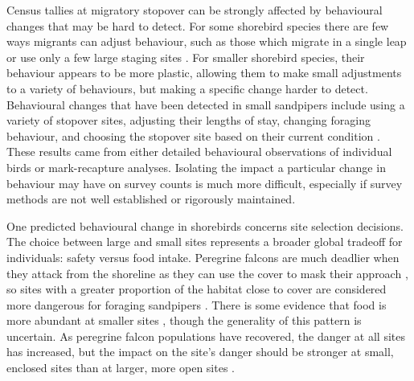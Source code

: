 Census tallies at migratory stopover can be strongly affected by behavioural changes that may be hard to detect. For some shorebird species there are few ways migrants can adjust behaviour, such as those which migrate in a single leap \citep{GillJr.2009} or use only a few large staging sites \citep{Gillings2009b}. For smaller shorebird species, their behaviour appears to be more plastic, allowing them to make small adjustments to a variety of behaviours, but making a specific change harder to detect. Behavioural changes that have been detected in small sandpipers include using a variety of stopover sites, adjusting their lengths of stay, changing foraging behaviour, and choosing the stopover site based on their current condition \citep{Ydenberg2002,Beauchamp2006a,pomeroy_tradeoffs_2006,Dekker2011,Hope2014,Quinn2012a}. These results came from either detailed behavioural observations of individual birds or mark-recapture analyses. Isolating the impact a particular change in behaviour may have on survey counts is much more difficult, especially if survey methods are not well established or rigorously maintained.

One predicted behavioural change in shorebirds concerns site selection decisions. The choice between large and small sites represents a broader global tradeoff for individuals: safety versus food intake. Peregrine falcons are much deadlier when they attack from the shoreline as they can use the cover to mask their approach \citep{Dekker2011}, so sites with a greater proportion of the habitat close to cover are considered more dangerous for foraging sandpipers \citep{pomeroy_experimental_2006}. There is some evidence that food is more abundant at smaller sites \citep{Pomeroy2008a,Sprague2008a}, though the generality of this pattern is uncertain. As peregrine falcon populations have recovered, the danger at all sites has increased, but the impact on the site's danger should be stronger at small, enclosed sites than at larger, more open sites \citep{Ydenberg2017}. 

